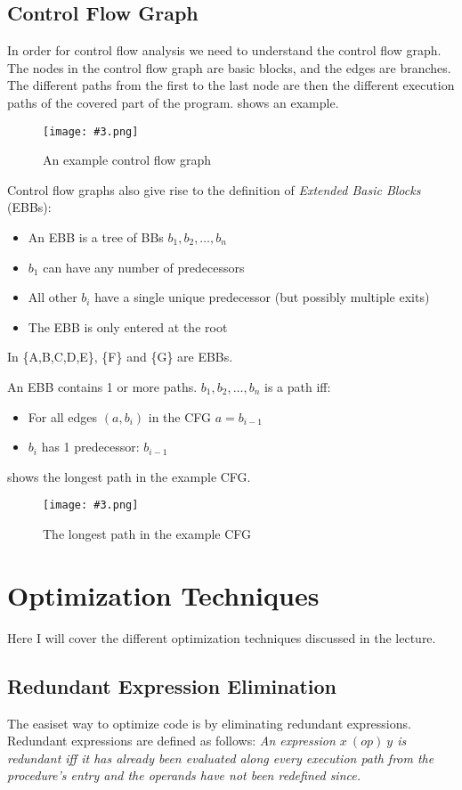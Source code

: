 \documentclass{article}
\newcommand{\fig}[4]{
	\begin{figure}[#1]
		\center
		\texttt{[image: \#3.png]}
		\caption{#4}
		\label{fig:#3}
	\end{figure}
	}
\begin{document}
\subsection{Control Flow Graph}
\label{cfg}
In order for control flow analysis we need to understand the control flow graph.
The nodes in the control flow graph are basic blocks, and the edges are branches.
The different paths from the first to the last node are then the different execution paths of the covered part of the program.
 shows an example.

\fig{h}{0.7}{cfg}{An example control flow graph}

Control flow graphs also give rise to the definition of \emph{Extended Basic Blocks} (EBBs):
\begin{itemize}
	\item An EBB is a tree of BBs $b_1,b_2,\dots,b_n$
	\item $b_1$ can have any number of predecessors
	\item All other $b_i$ have a single unique predecessor (but possibly multiple exits)
	\item The EBB is only entered at the root
\end{itemize}
In  \{A,B,C,D,E\}, \{F\} and \{G\} are EBBs.

An EBB contains 1 or more paths.
$b_1,b_2,\dots,b_n$ is a path iff:
\begin{itemize}
	\item For all edges $(a, b_i)$ in the CFG $a=b_{i-1}$
	\item $b_i$ has 1 predecessor: $b_{i-1}$
\end{itemize}
 shows the longest path in the example CFG.

\fig{h}{0.7}{path}{The longest path in the example CFG}

\section{Optimization Techniques}
Here I will cover the different optimization techniques discussed in the lecture.

\subsection{Redundant Expression Elimination}
The easiset way to optimize code is by eliminating redundant expressions.
Redundant expressions are defined as follows:
\emph{An expression $x\ (op)\ y$ is redundant iff it has already been evaluated along every execution path from the procedure's entry and the operands have not been redefined since.}
\end{document}
